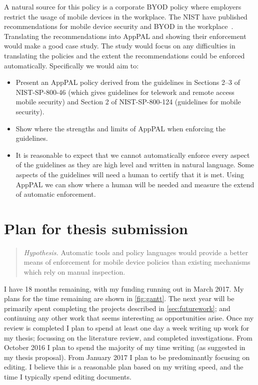 \documentclass[a4paper]{scrartcl}
\begin{document}
A natural source for this policy is a corporate \ac{BYOD} policy where employers restrict the usage of mobile devices in the workplace.
The \ac{NIST} have published recommendations for mobile device security and \ac{BYOD} in the workplace~\citep{Souppaya:2013jf,Scarfone:2009vy}.
Translating the recommendations into AppPAL and showing their enforcement would make a good case study.
The study would focus on any difficulties in translating the policies and the extent the recommendations could be enforced automatically.
Specifically we would aim to:
\begin{itemize}
  \item
    Present an AppPAL policy derived from the guidelines in Sections 2--3 of NIST-SP-800-46 (which gives guidelines for telework and remote access mobile security) and Section 2 of NIST-SP-800-124 (guidelines for mobile security).
  \item
    Show where the strengths and limits of AppPAL when enforcing the guidelines.
  \item
    It is reasonable to expect that we cannot automatically enforce every aspect of the guidelines as they are high level and written in natural language.
    Some aspects of the guidelines will need a human to certify that it is met.
    Using AppPAL we can show where a human will be needed and measure the extend of automatic enforcement.
\end{itemize}

\section{Plan for thesis submission}

\begin{quote}
  \emph{Hypothesis.} Automatic tools and policy languages would provide a
  better means of enforcement for mobile device policies than existing
  mechanisms which rely on manual inspection.
\end{quote}

I have 18 months remaining, with my funding running out in March 2017.
My plans for the time remaining are shown in \autoref{fig:gantt}.
The next year will be primarily spent completing the projects described in \autoref{sec:futurework}; and continuing any other work that seems interesting as opportunities arise.
Once my review is completed I plan to spend at least one day a week writing up work for my thesis; focussing on the literature review, and completed investigations.
From October 2016 I plan to spend the majority of my time writing (as suggested in my thesis proposal).
From January 2017 I plan to be predominantly focusing on editing.
I believe this is a reasonable plan based on my writing speed, and the time I typically spend editing documents.
\end{document}
